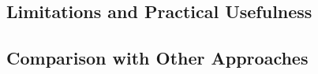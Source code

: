 \subsection{Limitations and Practical Usefulness}

\subsection{Comparison with Other Approaches}





